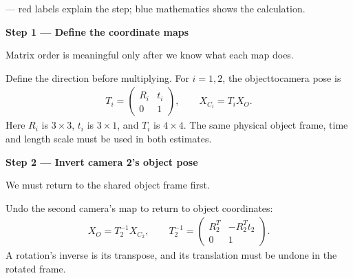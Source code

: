\documentclass[letterpaper,11pt,english,openany,oneside]{jupyterBook}
\begin{document}
\par\medskip

\sphinxAtStartPar
{} — red labels explain the step; blue mathematics shows the calculation.

\par\medskip{}
{\color{QuizStepRed}\bfseries Step 1 — Define the coordinate maps}\par\smallskip

\sphinxAtStartPar
{} Matrix order is meaningful only after we know what each map does.

\sphinxAtStartPar
Define the direction before multiplying. For {\color{QuizMathBlue} \(i=1,2\)}, the object\sphinxhyphen{}to\sphinxhyphen{}camera pose is
{\color{QuizMathBlue} \begin{equation*}
\begin{split}
T_i=\begin{pmatrix}R_i&t_i\\0&1\end{pmatrix},\qquad X_{C_i}=T_iX_O.
\end{split}
\end{equation*}}
\sphinxAtStartPar
Here {\color{QuizMathBlue} \(R_i\)} is {\color{QuizMathBlue} \(3\times3\)}, {\color{QuizMathBlue} \(t_i\)} is {\color{QuizMathBlue} \(3\times1\)}, and {\color{QuizMathBlue} \(T_i\)} is {\color{QuizMathBlue} \(4\times4\)}. The same physical object frame, time and length scale must be used in both estimates.

\par

\par\medskip{}
{\color{QuizStepRed}\bfseries Step 2 — Invert camera 2's object pose}\par\smallskip

\sphinxAtStartPar
{} We must return to the shared object frame first.

\sphinxAtStartPar
Undo the second camera’s map to return to object coordinates:
{\color{QuizMathBlue} \begin{equation*}
\begin{split}
X_O=T_2^{-1}X_{C_2},\qquad T_2^{-1}=\begin{pmatrix}R_2^T&-R_2^Tt_2\\0&1\end{pmatrix}.
\end{split}
\end{equation*}}
\sphinxAtStartPar
A rotation’s inverse is its transpose, and its translation must be undone in the rotated frame.
\end{document}
